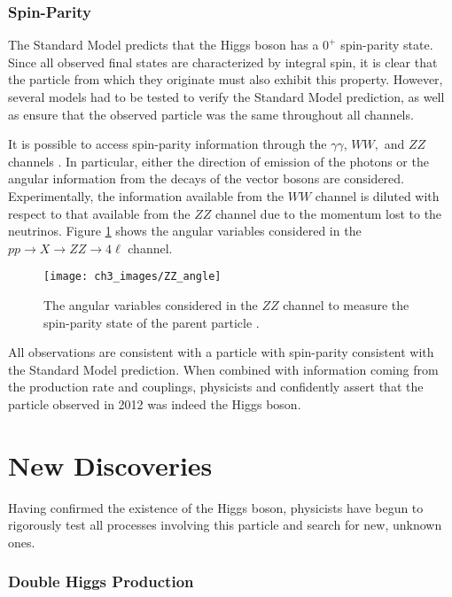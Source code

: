 \documentclass[10pt,a4paper]{book}
\begin{document}
\subsubsection{Spin-Parity}
The Standard Model predicts that the Higgs boson has a $0^+$ spin-parity state. Since all observed final states are characterized by integral spin, it is clear that the particle from which they originate must also exhibit this property. However, several models had to be tested to verify the Standard Model prediction, as well as ensure that the observed particle was the same throughout all channels.

It is possible to access spin-parity information through the $\gamma\gamma$, $WW,$ and $ZZ$ channels \cite{ATLAS:2013xga, ATLAS:2015zhl, CMS:2014nkk}. In particular, either the direction of emission of the photons or the angular information from the decays of the vector bosons are considered. Experimentally, the information available from the $WW$ channel is diluted with respect to that available from the $ZZ$ channel due to the momentum lost to the neutrinos. Figure \ref{ZZ spin} shows the angular variables considered in the $pp \rightarrow X \rightarrow ZZ \rightarrow 4\ell$ channel.

\begin{figure}
\centering
\texttt{[image: ch3\_images/ZZ\_angle]}
\caption{The angular variables considered in the $ZZ$ channel to measure the spin-parity state of the parent particle \cite{higgs_review}.}
\label{ZZ spin}
\end{figure}

All observations are consistent with a particle with spin-parity consistent with the Standard Model prediction. When combined with information coming from the production rate and couplings, physicists and confidently assert that the particle observed in 2012 was indeed the Higgs boson. 

\section{New Discoveries}

Having confirmed the existence of the Higgs boson, physicists have begun to rigorously test all processes involving this particle and search for new, unknown ones. 

\subsubsection{Double Higgs Production}
\end{document}
